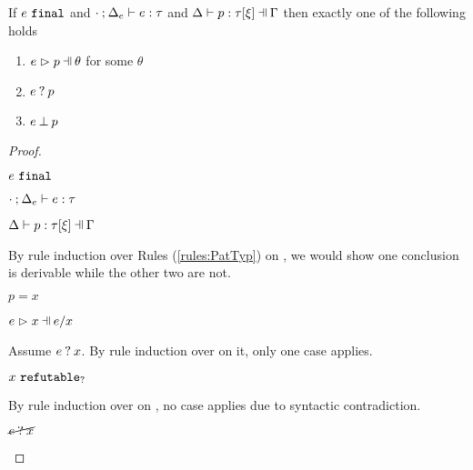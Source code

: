 \begin{lemma}
  \label{lem:match-determinism}
  If $e ~\mathtt{final}$ and $\cdot \mathbin{;} \Delta_e \vdash e : \tau$ and $\chpattyp{p}{\tau}{\xi}{\Gamma}{\Delta}$ then exactly one of the following holds
  \begin{enumerate}
    \item $\hpatmatch{e}{p}{\theta}$ for some $\theta$
    \item $e \mathbin{?} p$
    \item $e \mathbin{\bot} p$
  \end{enumerate}
\end{lemma}
\begin{proof}
\begin{pfsteps*}
\item $e ~\mathtt{final}$  
\item $\cdot \mathbin{;} \Delta_e \vdash e : \tau$  
\item $\chpattyp{p}{\tau}{\xi}{\Gamma}{\Delta}$  
\end{pfsteps*}
By rule induction over Rules (\ref{rules:PatTyp}) on , we would show one conclusion is derivable while the other two are not.
\begin{byCases}
\item[\text{(\ref{rule:PTVar})}]
    \begin{pfsteps*}
    \item $p=x$ 
    \item $\hpatmatch{e}{x}{e / x}$ 
    \end{pfsteps*}
    Assume $e \mathbin{?} x$. By rule induction over  on it, only one case applies.
    \begin{byCases}
    \item[\text{(\ref{rule:MMNotIntro})}]
        \begin{pfsteps*}
        \item $x ~\mathtt{refutable}_?$  
        \end{pfsteps*}
        By rule induction over  on , no case applies due to syntactic contradiction.
    \end{byCases}
    \begin{pfsteps*}
    \item $\cancel{e \mathbin{?} x}$ 
    \end{pfsteps*}

\end{byCases}
\end{proof}
